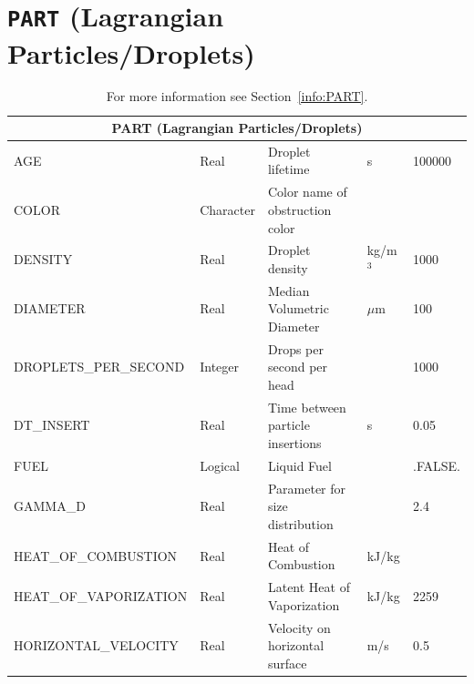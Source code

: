 \documentclass[11pt]{book}
\begin{document}
\vspace{\baselineskip}

\vfill


\section{\texorpdfstring{{\tt PART}}{PART} (Lagrangian Particles/Droplets)}

\hspace{1in}

\begin{table}[H]
\caption{For more information see Section~\ref{info:PART}.}\label{tbl:PART}
\noindent
\begin{tabular*}{\textwidth}{@{\extracolsep{\fill}}|l|l|l|l|l|}
\hline
\multicolumn{5}{|c|}{{\ct PART} (Lagrangian Particles/Droplets)} \\ \hline \hline
{\ct AGE}                       & Real            & Droplet lifetime                  & s         & 100000        \\ \hline
{\ct COLOR}                     & Character       & Color name of obstruction color   &           &               \\ \hline
{\ct DENSITY}                   & Real            & Droplet density                   & kg/m$^3$  & 1000          \\ \hline
{\ct DIAMETER}                  & Real            & Median Volumetric Diameter        & $\mu$m    & 100           \\ \hline
{\ct DROPLETS\_PER\_SECOND}     & Integer         & Drops per second per head         &           & 1000          \\ \hline
{\ct DT\_INSERT}                & Real            & Time between particle insertions  & s         & 0.05          \\ \hline
{\ct FUEL}                      & Logical         & Liquid Fuel                       &           & {\ct .FALSE.} \\ \hline
{\ct GAMMA\_D}                  & Real            & Parameter for size distribution   &           & 2.4           \\ \hline
{\ct HEAT\_OF\_COMBUSTION}      & Real            & Heat of Combustion                & kJ/kg     &               \\ \hline
{\ct HEAT\_OF\_VAPORIZATION}    & Real            & Latent Heat of Vaporization       & kJ/kg     & 2259          \\ \hline
{\ct HORIZONTAL\_VELOCITY}      & Real            & Velocity on horizontal surface    & m/s       &  0.5          \\ \hline

\end{tabular*}
\end{table}
\end{document}
